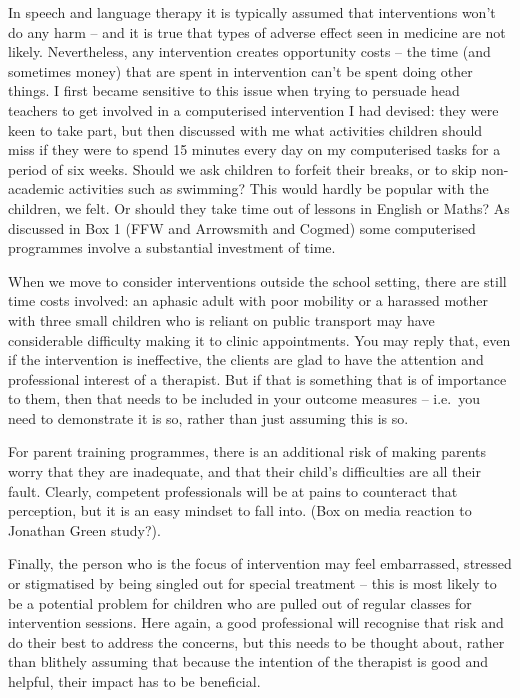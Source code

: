 \documentclass[]{book}
\begin{document}
In speech and language therapy it is typically assumed that interventions won't do any harm -- and it is true that types of adverse effect seen in medicine are not likely. Nevertheless, any intervention creates opportunity costs -- the time (and sometimes money) that are spent in intervention can't be spent doing other things. I first became sensitive to this issue when trying to persuade head teachers to get involved in a computerised intervention I had devised: they were keen to take part, but then discussed with me what activities children should miss if they were to spend 15 minutes every day on my computerised tasks for a period of six weeks. Should we ask children to forfeit their breaks, or to skip non-academic activities such as swimming? This would hardly be popular with the children, we felt. Or should they take time out of lessons in English or Maths? As discussed in Box 1 (FFW and Arrowsmith and Cogmed) some computerised programmes involve a substantial investment of time.

When we move to consider interventions outside the school setting, there are still time costs involved: an aphasic adult with poor mobility or a harassed mother with three small children who is reliant on public transport may have considerable difficulty making it to clinic appointments. You may reply that, even if the intervention is ineffective, the clients are glad to have the attention and professional interest of a therapist. But if that is something that is of importance to them, then that needs to be included in your outcome measures -- i.e.~you need to demonstrate it is so, rather than just assuming this is so.

For parent training programmes, there is an additional risk of making parents worry that they are inadequate, and that their child's difficulties are all their fault. Clearly, competent professionals will be at pains to counteract that perception, but it is an easy mindset to fall into. (Box on media reaction to Jonathan Green study?).

Finally, the person who is the focus of intervention may feel embarrassed, stressed or stigmatised by being singled out for special treatment -- this is most likely to be a potential problem for children who are pulled out of regular classes for intervention sessions. Here again, a good professional will recognise that risk and do their best to address the concerns, but this needs to be thought about, rather than blithely assuming that because the intention of the therapist is good and helpful, their impact has to be beneficial.
\end{document}
